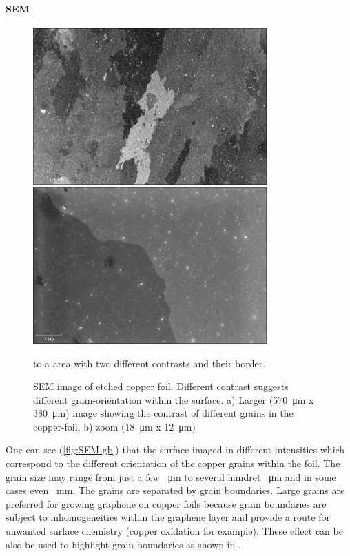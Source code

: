 \paragraph{SEM}



\begin{figure}[]
	\begin{center}
		\includegraphics[height=6cm]{./images/Domenik_16031715.jpg}
		\includegraphics[height=6cm]{./images/Domenik_16031717.jpg}
	\end{center}
	\caption{SEM image of etched copper foil. Different contrast suggests different grain-orientation within the surface. a) Larger (\SI{570}{\micro \meter} x \SI{380}{\micro \meter}) image showing the contrast of different grains in the copper-foil, b) zoom (\SI{18}{\micro \meter} x \SI{12}{\micro \meter})} to a area with two different contrasts and their border.
	\label{fig:SEM-gb}
\end{figure}

One can see (\autoref{fig:SEM-gb}) that the surface imaged in different intensities which correspond to the different orientation of the copper grains within the foil\cite{wu_effects_2015}. The grain size may range from just a few \SI{}{\micro \meter} to several hundret \SI{}{\micro \meter} and in some cases even \SI{}{\milli \meter}. The grains are separated by grain boundaries. Large grains are preferred for growing graphene on copper foils because grain boundaries are subject to inhomogeneities within the graphene layer and provide a route for unwanted surface chemistry (copper oxidation for example). These effect can be also be used to highlight grain boundaries as shown in \cite{wu_effects_2015}.

